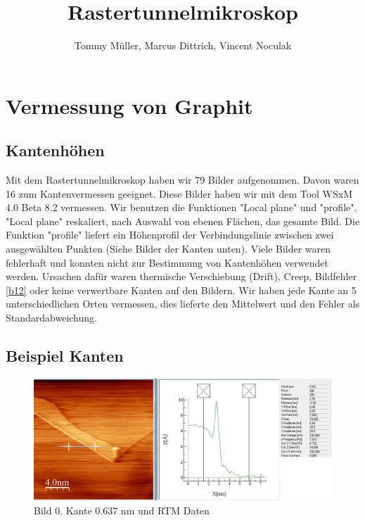 \documentclass[10pt,a4paper]{article}
\author{Tommy Müller, Marcus Dittrich, Vincent Noculak}
\title{Rastertunnelmikroskop}
\begin{document}
\maketitle
\newpage
\tableofcontents
\newpage

\section{Vermessung von Graphit }

\subsection{ Kantenhöhen}

Mit dem Rastertunnelmikroskop haben wir 79 Bilder aufgenommen. Davon waren 16 zum Kantenvermessen geeignet.
Diese Bilder haben wir mit dem Tool WSxM 4.0 Beta 8.2 vermessen. 
Wir benutzen die Funktionen "Local plane" und "profile". "Local plane" reskaliert, nach Auswahl von ebenen Flächen, das gesamte Bild.  Die Funktion "profile" liefert ein Höhenprofil der Verbindungslinie zwischen zwei ausgewählten Punkten (Siehe Bilder der Kanten unten).
Viele Bilder waren fehlerhaft und konnten nicht zur Bestimmung von Kantenhöhen verwendet werden.
Ursachen dafür waren thermische Verschiebung (Drift), Creep, Bildfehler \ref{b12} oder keine verwertbare Kanten auf den Bildern. Wir haben jede Kante an 5 unterschiedlichen Orten vermessen, dies lieferte den Mittelwert und den Fehler als Standardabweichung.



\subsection{Beispiel Kanten}

\begin{figure}[]
	\includegraphics[scale = 0.3]{bild00.png}
	\centering
	\caption{Bild 0. Kante 0.637 nm und RTM Daten}
	\label{b0}
\end{figure}
\end{document}
